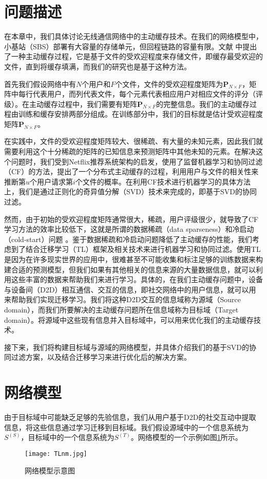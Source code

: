 \documentclass[bachelor]{seuthesis} %
\begin{document}
\begin{Main}
\section{问题描述}
在本章中，我们具体讨论无线通信网络中的主动缓存技术。在我们的网络模型中，小基站（SBS）部署有大容量的存储单元，但回程链路的容量有限。文献
\cite{bastug2013proactive}中提出了一种主动缓存过程，它是基于文件的受欢迎程度来存储文件，即缓存最受欢迎的文件，直到将缓存填满，而我们的研究也是基于这种方法。\par
首先我们假设网络中有$N$个用户和$F$个文件，文件的受欢迎程度矩阵为$\textbf{P}_{N\times F}$，矩阵中每行代表用户，而列代表文件，每个元素代表相应用户对相应文件的评分（评级）。在主动缓存过程中，我们需要有矩阵$\textbf{P}_{N\times F}$的完整信息。我们的主动缓存过程由训练和缓存安排两部分组成。在训练部分中，我们的目标就是估计受欢迎程度矩阵$\textbf{P}_{N\times F}$。\par
在实践中，文件的受欢迎程度矩阵较大、很稀疏、有大量的未知元素，因此我们就需要利用这个十分稀疏的矩阵的已知信息来预测矩阵中其他未知的元素。在解决这个问题时，我们受到Netflix推荐系统架构的启发，使用了监督机器学习和协同过滤（CF）的方法，提出了一个分布式主动缓存的过程，利用用户与文件的相关性来推断第$u$个用户请求第$i$个文件的概率。在利用CF技术进行机器学习的具体方法上，我们是通过正则化的奇异值分解（SVD）技术来完成的，即基于SVD的协同过滤。\par
然而，由于初始的受欢迎程度矩阵通常很大，稀疏，用户评级很少，就导致了CF学习方法的效率比较低下，这就是所谓的数据稀疏（data sparseness）和冷启动（cold-start）问题
\cite{lee2012comparative}。鉴于数据稀疏和冷启动问题降低了主动缓存的性能，我们考虑到了结合迁移学习（TL）框架及相关技术来进行机器学习和协同过滤\cite{pan2010survey}。使用TL是因为在许多现实世界的应用中，很难甚至不可能收集和标注足够的训练数据来构建合适的预测模型，但我们如果有其他相关的信息来源的大量数据信息，就可以利用这些丰富的数据来帮助我们来进行学习。具体的，在我们主动缓存问题中，设备与设备间（D2D）相互通信、交互的信息，即社交网络中的用户信息，就可以用来帮助我们实现迁移学习。我们将这种D2D交互的信息域称为源域（Source domain），而我们所要解决的主动缓存问题所在信息域称为目标域（Target domain）。将源域中这些现有信息并入目标域中，可以用来优化我们的主动缓存技术。\par
接下来，我们将构建目标域与源域的网络模型，并具体介绍我们的基于SVD的协同过滤方案，以及结合迁移学习来进行优化后的解决方案。
\section{网络模型}
由于目标域中可能缺乏足够的先验信息，我们从用户基于D2D的社交互动中提取信息，将这些信息通过学习迁移到目标域。我们假设源域中的一个信息系统为$S^{(S)}$，目标域中的一个信息系统为$S^{(T)}$。网络模型的一个示例如图\ref{TLnm}所示。
\begin{figure}{}
\centering
\texttt{[image: TLnm.jpg]}
\caption{网络模型示意图}\label{TLnm}
\end{figure}

\end{Main}
\end{document}
